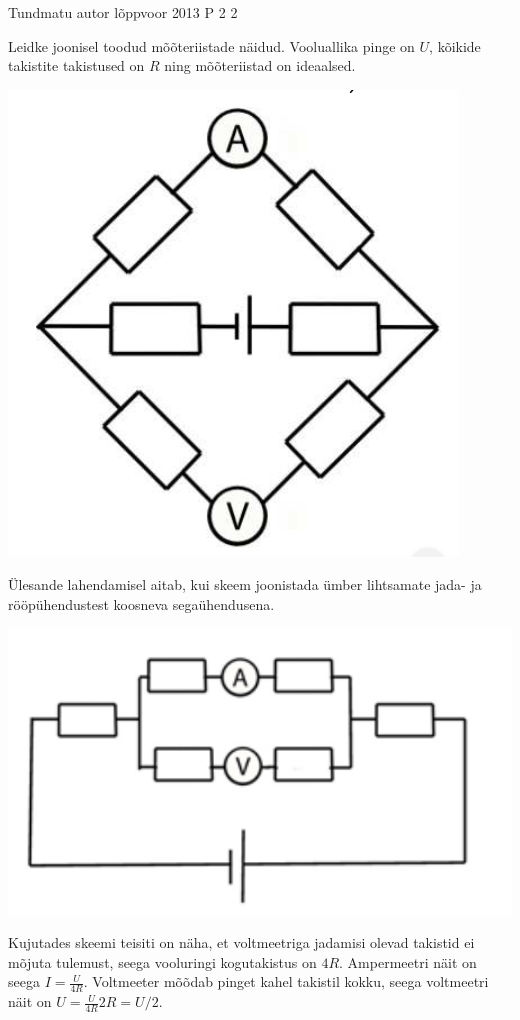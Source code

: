 {Tundmatu autor} %
{lõppvoor} %
{2013} %
{P 2} %
{2} %
{

\ifStatement
Leidke joonisel toodud mõõteriistade näidud. Vooluallika pinge on $U$, kõikide takistite takistused on $R$ ning mõõteriistad on ideaalsed.
\begin{center}
	\includegraphics[width=0.5\linewidth]{2013-v3p-02-yl.png}
\end{center}
\fi

\ifHint
Ülesande lahendamisel aitab, kui skeem joonistada ümber lihtsamate jada- ja rööpühendustest koosneva segaühendusena.
\fi

\ifSolution
\begin{center}
	\includegraphics[width=0.5\linewidth]{2013-v3p-02-lah.png}
\end{center}
Kujutades skeemi teisiti on näha, et voltmeetriga jadamisi olevad takistid ei mõjuta tulemust, seega vooluringi kogutakistus on $4R$. Ampermeetri näit on seega $I = \frac{U}{4R}$. Voltmeeter mõõdab pinget kahel takistil kokku, seega voltmeetri näit on $U = \frac{U}{4R} 2R = U / 2$.
\fi
}